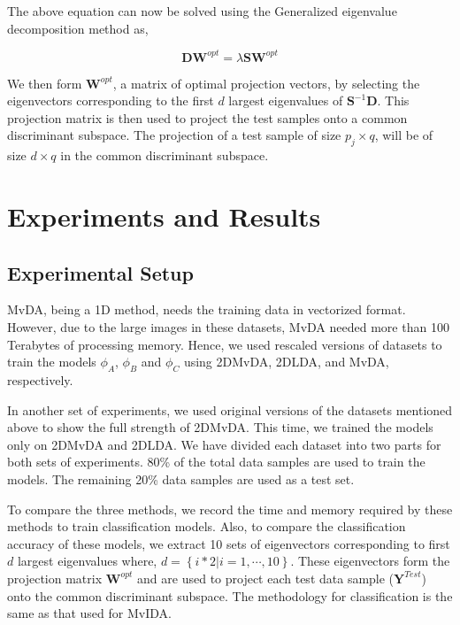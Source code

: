 \noindent
The above equation can now be solved using the Generalized eigenvalue decomposition method as,

\begin{equation}
\label{eqn:2DMvDA_GEP}
\textbf{D} \textbf{W}^{opt}=\lambda \textbf{S} \textbf{W}^{opt}
\end{equation}

We then form $\textbf{W}^{opt}$, a matrix of optimal projection vectors, by selecting the eigenvectors corresponding to the first $d$ largest eigenvalues of $\textbf{S}^{-1} \textbf{D}$. This projection matrix is then used to project the test samples onto a common discriminant subspace. The projection of a test sample of size $p_j \times q$, will be of size $d \times q$ in the common discriminant subspace.










\section{Experiments and Results}
\label{sec:2DMvDA_Expt}

\subsection{Experimental Setup}
\label{subs:2DMvDA_Expt_Setup}
MvDA, being a 1D method, needs the training data in vectorized format. However, due to the large images in these datasets, MvDA needed more than 100 Terabytes of processing memory. Hence, we used rescaled versions of datasets to train the models $\phi_A$, $\phi_B$ and $\phi_C$ using 2DMvDA, 2DLDA, and MvDA, respectively.

In another set of experiments, we used original versions of the datasets mentioned above to show the full strength of 2DMvDA. This time, we trained the models only on 2DMvDA and 2DLDA. We have divided each dataset into two parts for both sets of experiments. 80\% of the total data samples are used to train the models. The remaining 20\% data samples are used as a test set.

To compare the three methods, we record the time and memory required by these methods to train classification models. Also, to compare the classification accuracy of these models, we extract 10 sets of eigenvectors corresponding to first $d$ largest eigenvalues where, $d = \left \{ i*2|i=1, \cdots, 10 \right \}$. These eigenvectors form the projection matrix $\textbf{W}^{opt}$ and are used to project each test data sample ($\textbf{Y}^{Test}$) onto the common discriminant subspace. The methodology for classification is the same as that used for MvIDA.










